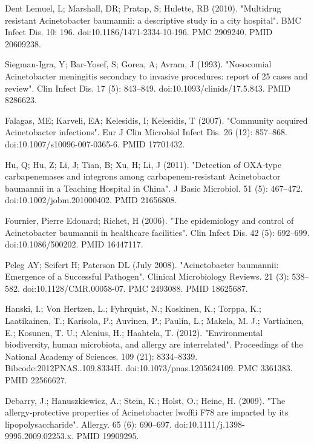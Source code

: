 \documentclass[11pt]{article}
\begin{document}
\begin{thebibliography}{3}
		 Dent Lemuel, L; Marshall, DR; Pratap, S; Hulette, RB (2010). "Multidrug resistant Acinetobacter baumannii: a descriptive study in a city hospital". BMC Infect Dis. 10: 196. doi:10.1186/1471-2334-10-196. PMC 2909240. PMID 20609238.
		
		 Siegman-Igra, Y; Bar-Yosef, S; Gorea, A; Avram, J (1993). "Nosocomial Acinetobacter meningitis secondary to invasive procedures: report of 25 cases and review". Clin Infect Dis. 17 (5): 843–849. doi:10.1093/clinids/17.5.843. PMID 8286623.
		
		 Falagas, ME; Karveli, EA; Kelesidis, I; Kelesidis, T (2007). "Community acquired Acinetobacter infections". Eur J Clin Microbiol Infect Dis. 26 (12): 857–868. doi:10.1007/s10096-007-0365-6. PMID 17701432.
		
		 Hu, Q; Hu, Z; Li, J; Tian, B; Xu, H; Li, J (2011). "Detection of OXA-type carbapenemases and integrons among carbapenem-resistant Acinetobactor baumannii in a Teaching Hospital in China". J Basic Microbiol. 51 (5): 467–472. doi:10.1002/jobm.201000402. PMID 21656808.
		
		 Fournier, Pierre Edouard; Richet, H (2006). "The epidemiology and control of Acinetobacter baumannii in healthcare facilities". Clin Infect Dis. 42 (5): 692–699. doi:10.1086/500202. PMID 16447117.
		
	 Peleg AY; Seifert H; Paterson DL (July 2008). "Acinetobacter baumannii: Emergence of a Successful Pathogen". Clinical Microbiology Reviews. 21 (3): 538–582. doi:10.1128/CMR.00058-07. PMC 2493088. PMID 18625687.
		
	 Hanski, I.; Von Hertzen, L.; Fyhrquist, N.; Koskinen, K.; Torppa, K.; Laatikainen, T.; Karisola, P.; Auvinen, P.; Paulin, L.; Makela, M. J.; Vartiainen, E.; Kosunen, T. U.; Alenius, H.; Haahtela, T. (2012). "Environmental biodiversity, human microbiota, and allergy are interrelated". Proceedings of the National Academy of Sciences. 109 (21): 8334–8339. Bibcode:2012PNAS..109.8334H. doi:10.1073/pnas.1205624109. PMC 3361383. PMID 22566627.
		
	 Debarry, J.; Hanuszkiewicz, A.; Stein, K.; Holst, O.; Heine, H. (2009). "The allergy-protective properties of Acinetobacter lwoffii F78 are imparted by its lipopolysaccharide". Allergy. 65 (6): 690–697. doi:10.1111/j.1398-9995.2009.02253.x. PMID 19909295.
		

\end{thebibliography}
\end{document}
